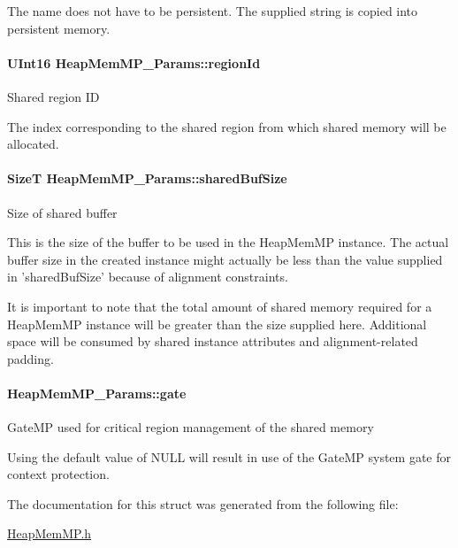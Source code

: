 The name does not have to be persistent. The supplied string is copied into persistent memory. 
\paragraph[{regionId}]{\setlength{\rightskip}{0pt plus 5cm}UInt16 {\bf HeapMemMP\_\-Params::regionId}}\hfill\label{struct_heap_mem_m_p___params_ad1a5b94d015d0b5b75f091ca9be8a04e}
Shared region ID

The index corresponding to the shared region from which shared memory will be allocated. 
\paragraph[{sharedBufSize}]{\setlength{\rightskip}{0pt plus 5cm}SizeT {\bf HeapMemMP\_\-Params::sharedBufSize}}\hfill\label{struct_heap_mem_m_p___params_a7206d2bd65bf705da74310fd004b67bf}
Size of shared buffer

This is the size of the buffer to be used in the HeapMemMP instance. The actual buffer size in the created instance might actually be less than the value supplied in 'sharedBufSize' because of alignment constraints.

It is important to note that the total amount of shared memory required for a HeapMemMP instance will be greater than the size supplied here. Additional space will be consumed by shared instance attributes and alignment-\/related padding. 
\paragraph[{gate}]{ {\bf HeapMemMP\_\-Params::gate}}\hfill\label{struct_heap_mem_m_p___params_ab07964aed674d108f19482a0d35e4e46}
GateMP used for critical region management of the shared memory

Using the default value of NULL will result in use of the GateMP system gate for context protection. 

The documentation for this struct was generated from the following file:\begin{DoxyCompactItemize}
\item 
\hyperlink{_heap_mem_m_p_8h}{HeapMemMP.h}\end{DoxyCompactItemize}
